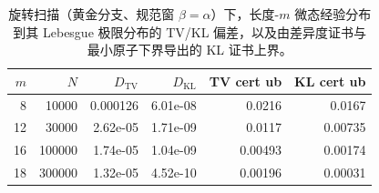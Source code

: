 \begin{table}[H]
\centering
\small
\begin{tabular}{rrrrrr}
\toprule
$m$ & $N$ & $D_{\mathrm{TV}}$ & $D_{\mathrm{KL}}$ & TV cert ub & KL cert ub\\
\midrule
8 & 10000 & 0.000126 & 6.01e-08 & 0.0216 & 0.0167\\
12 & 30000 & 2.62e-05 & 1.71e-09 & 0.0117 & 0.00735\\
16 & 100000 & 1.74e-05 & 1.04e-09 & 0.00493 & 0.00174\\
18 & 300000 & 1.32e-05 & 4.52e-10 & 0.00196 & 0.00031\\
\bottomrule
\end{tabular}
\caption{旋转扫描（黄金分支、规范窗 $\beta=\alpha$）下，长度-$m$ 微态经验分布到其 Lebesgue 极限分布的 TV/KL 偏差，以及由差异度证书与最小原子下界导出的 KL 证书上界。}
\label{tab:rotation-microstate-kl-certificate}
\end{table}
